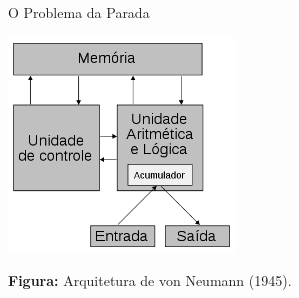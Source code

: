 \documentclass[xcolor=dvipsnames,table]{beamer}
\begin{document}
	\begin{frame}{O Problema da Parada}
		\begin{center}
    		\includegraphics[width=6cm]{images/arqVonNeumann.png}
    		
    		{\bf Figura:} Arquitetura de von Neumann (1945).
  		\end{center}
	\end{frame}
	
\end{document}
